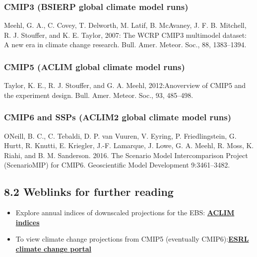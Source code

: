 \documentclass[
]{article}
\begin{document}
\hypertarget{cmip3-bsierp-global-climate-model-runs}{%
\subsubsection{CMIP3 (BSIERP global climate model
runs)}\label{cmip3-bsierp-global-climate-model-runs}}

Meehl, G. A., C. Covey, T. Delworth, M. Latif, B. McAvaney, J. F. B.
Mitchell, R. J. Stouffer, and K. E. Taylor, 2007: The WCRP CMIP3
multimodel dataset: A new era in climate change research. Bull. Amer.
Meteor. Soc., 88, 1383--1394.

\hypertarget{cmip5-aclim-global-climate-model-runs}{%
\subsubsection{CMIP5 (ACLIM global climate model
runs)}\label{cmip5-aclim-global-climate-model-runs}}

Taylor, K. E., R. J. Stouffer, and G. A. Meehl, 2012:Anoverview of CMIP5
and the experiment design. Bull. Amer. Meteor. Soc., 93, 485--498.

\hypertarget{cmip6-and-ssps-aclim2-global-climate-model-runs}{%
\subsubsection{CMIP6 and SSPs (ACLIM2 global climate model
runs)}\label{cmip6-and-ssps-aclim2-global-climate-model-runs}}

ONeill, B. C., C. Tebaldi, D. P. van Vuuren, V. Eyring, P.
Friedlingstein, G. Hurtt, R. Knutti, E. Kriegler, J.-F. Lamarque, J.
Lowe, G. A. Meehl, R. Moss, K. Riahi, and B. M. Sanderson. 2016. The
Scenario Model Intercomparison Project (ScenarioMIP) for CMIP6.
Geoscientific Model Development 9:3461--3482.

\hypertarget{weblinks-for-further-reading}{%
\subsection{8.2 Weblinks for further
reading}\label{weblinks-for-further-reading}}

\begin{itemize}
\item
  Explore annual indices of downscaled projections for the EBS:
  \href{https://kholsman.shinyapps.io/aclim/}{\textbf{ACLIM indices}}
\item
  To view climate change projections from CMIP5 (eventually
  CMIP6):\href{https://www.esrl.noaa.gov/psd/ipcc/ocn/}{\textbf{ESRL
  climate change portal }}
\end{itemize}
\end{document}
